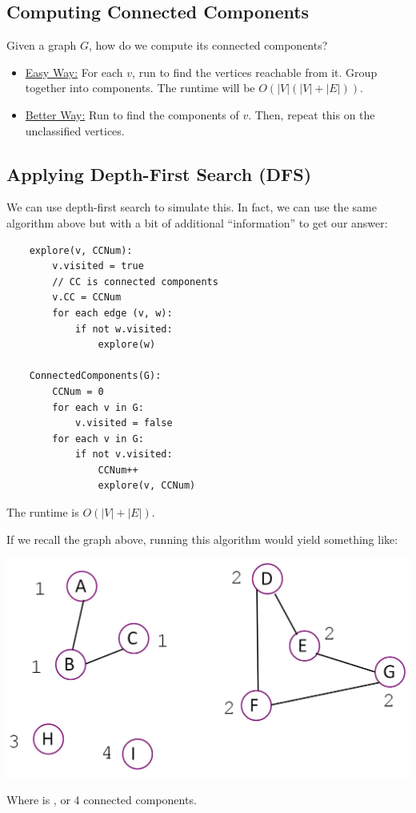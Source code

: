 \documentclass[letterpaper]{article}
\begin{document}
\subsection{Computing Connected Components}
Given a graph $G$, how do we compute its connected components? 
\begin{itemize}
    \item \underline{Easy Way:} For each $v$, run  to find the vertices reachable from it. Group together into components. The runtime will be $O(|V|(|V| + |E|))$. 
    \item \underline{Better Way:} Run  to find the components of $v$. Then, repeat this on the unclassified vertices. 
\end{itemize}

\subsection{Applying Depth-First Search (DFS)}
We can use depth-first search to simulate this. In fact, we can use the same algorithm above but with a bit of additional ``information'' to get our answer:
\begin{verbatim}
    explore(v, CCNum):
        v.visited = true 
        // CC is connected components
        v.CC = CCNum 
        for each edge (v, w):
            if not w.visited: 
                explore(w)

    ConnectedComponents(G):
        CCNum = 0
        for each v in G:
            v.visited = false
        for each v in G: 
            if not v.visited: 
                CCNum++
                explore(v, CCNum)
\end{verbatim}
The runtime is $O(|V| + |E|)$. 

\bigskip

If we recall the graph above, running this algorithm would yield something like:
\begin{center}
    \includegraphics[scale=0.35]{../assets/graph_con_3.png}
\end{center}
Where  is , or 4 connected components. 
\end{document}
